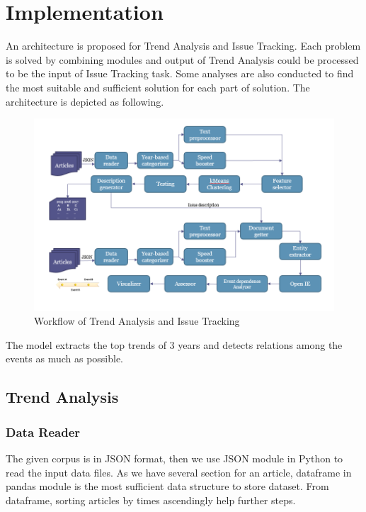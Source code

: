 \section{Implementation}
An architecture is proposed for Trend Analysis and Issue Tracking. Each problem is solved by combining modules and output of Trend Analysis could be processed to be the input of Issue Tracking task. Some analyses are also conducted to find the most suitable and sufficient solution for each part of solution.
The architecture is depicted as following.
\begin{figure}[h]
\centering
\includegraphics[scale= 0.4]{work_flow.png}
\caption{Workflow of Trend Analysis and Issue Tracking}
\end{figure}
The model extracts the top trends of 3 years and detects relations among the events as much as possible.
\subsection{Trend Analysis}
\subsubsection{Data Reader}
The given corpus is in JSON format, then we use JSON module in Python to read the input data files. As we have several section for an article, dataframe in pandas module is the most sufficient data structure to store dataset. 
From dataframe, sorting articles by times ascendingly help further steps.
